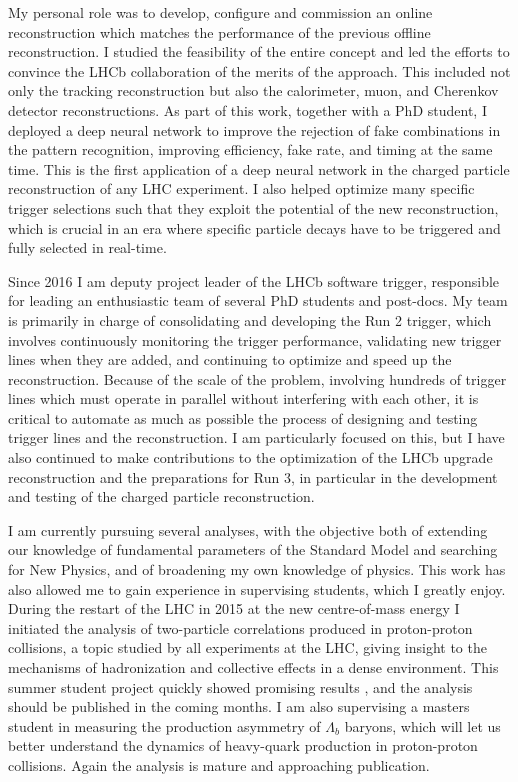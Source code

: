\documentclass[12pt,a4paper,sans]{moderncv}
\begin{document}
My personal role was to develop, configure and commission an online reconstruction
which matches the performance of the previous offline reconstruction. I studied the feasibility 
of the entire concept and led the efforts to convince the LHCb collaboration
of the merits of the approach. This included not only the tracking reconstruction
but also the calorimeter, muon, and Cherenkov detector reconstructions. As part of this work, together with a PhD student,
I deployed a deep neural network to improve the rejection of fake combinations in the pattern recognition,
improving efficiency, fake rate, and timing at the same time.
This is the first application of a deep neural network in the charged particle reconstruction of any LHC experiment. 
I also helped optimize many specific trigger selections such that they exploit the potential of the new reconstruction,
which is crucial in an era where specific particle decays have to 
be triggered and fully selected in real-time. 

Since 2016 I am deputy project leader of the LHCb software trigger, 
responsible for leading an enthusiastic team of several PhD students and post-docs.
My team is primarily in charge of consolidating and developing the Run 2 trigger,
which involves continuously monitoring the trigger performance, validating new trigger
lines when they are added, and continuing to optimize and speed up the reconstruction.
Because of the scale of the problem, involving hundreds of trigger lines which must
operate in parallel without interfering with each other, it is critical to automate
as much as possible the process of designing and testing trigger lines and the reconstruction.
I am particularly focused on this, but I have also continued to make contributions to the 
optimization of the LHCb upgrade reconstruction and the preparations for Run 3, in particular
in the development and testing of the charged particle reconstruction.

I am currently pursuing several analyses, with the objective both of extending our knowledge of fundamental
parameters of the Standard Model and searching for New Physics, and of broadening my own knowledge of physics.
This work has also allowed me to gain experience in supervising students, which I greatly enjoy.
During the restart of the LHC in 2015 at the new centre-of-mass energy I initiated 
the analysis of two-particle correlations produced in proton-proton collisions, 
a topic studied by all experiments at the LHC, giving insight to the mechanisms of hadronization
and collective effects in a dense environment. This summer student project quickly showed 
promising results \cite{Kopecna:2051967}, and the analysis should be published in the coming months.
I am also supervising a masters student in measuring the production asymmetry of $\Lambda_b$ baryons,
which will let us better understand the dynamics of heavy-quark production in 
proton-proton collisions. Again the analysis is mature and approaching publication.
\end{document}

